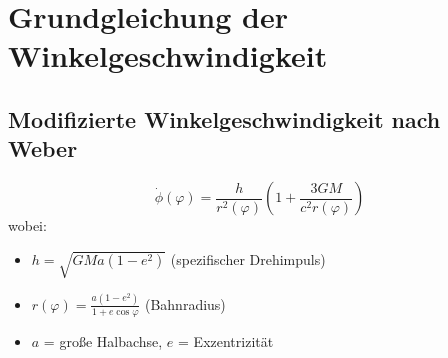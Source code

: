 \section{Grundgleichung der Winkelgeschwindigkeit}
\subsection{Modifizierte Winkelgeschwindigkeit nach Weber}
\[
\dot{\phi}(\varphi) = \frac{h}{r^2(\varphi)} \left(1 + \frac{3GM}{c^2 r(\varphi)}\right)
\]
wobei:
\begin{itemize}
    \item $h = \sqrt{GMa(1-e^2)}$ (spezifischer Drehimpuls)
    \item $r(\varphi) = \frac{a(1-e^2)}{1 + e \cos \varphi}$ (Bahnradius)
    \item $a$ = große Halbachse, $e$ = Exzentrizität
\end{itemize}